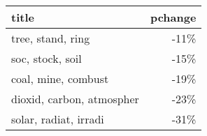 \begin{tabular}{p{1.2cm}r}
\toprule
                     title &  pchange \\
\midrule
         tree, stand, ring &     -11\% \\
          soc, stock, soil &     -15\% \\
       coal, mine, combust &     -19\% \\
 dioxid, carbon, atmospher &     -23\% \\
     solar, radiat, irradi &     -31\% \\
\bottomrule
\end{tabular}
